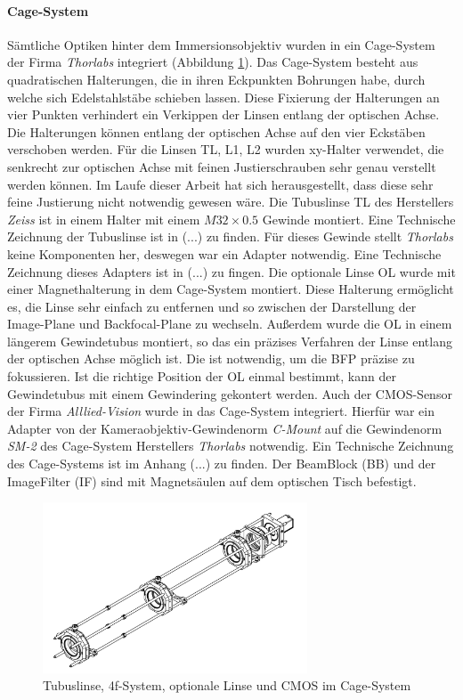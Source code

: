 \documentclass[titlepage]{article}
\begin{document}
	\paragraph{Cage-System}
	Sämtliche Optiken hinter dem Immersionsobjektiv wurden in ein Cage-System der Firma \textit{Thorlabs} integriert (Abbildung \ref{fig:cage_system}). Das Cage-System besteht aus quadratischen Halterungen, die in ihren Eckpunkten Bohrungen habe, durch welche sich Edelstahlstäbe schieben lassen. Diese Fixierung der Halterungen an vier Punkten verhindert ein Verkippen der Linsen entlang der optischen Achse. Die Halterungen können entlang der optischen Achse auf den vier Eckstäben verschoben werden. Für die  Linsen TL, L1, L2 wurden xy-Halter verwendet, die senkrecht zur optischen Achse mit feinen Justierschrauben sehr genau verstellt werden können. Im Laufe dieser Arbeit hat sich herausgestellt, dass diese sehr feine Justierung nicht notwendig gewesen wäre. Die Tubuslinse TL des Herstellers \textit{Zeiss} ist in einem Halter mit einem $M32\times0.5$ Gewinde montiert. Eine Technische Zeichnung der Tubuslinse ist in (...) zu finden. Für dieses Gewinde stellt \textit{Thorlabs} keine Komponenten her, deswegen war ein Adapter notwendig. Eine Technische Zeichnung dieses Adapters ist in (...) zu fingen. Die optionale Linse OL wurde mit einer Magnethalterung in dem Cage-System montiert. Diese Halterung ermöglicht es, die Linse sehr einfach zu entfernen und so zwischen der Darstellung der Image-Plane und Backfocal-Plane zu wechseln. Außerdem wurde die OL in einem längerem Gewindetubus montiert, so das ein präzises Verfahren der Linse entlang der optischen Achse möglich ist. Die ist notwendig, um die BFP präzise zu fokussieren. Ist die richtige Position der OL einmal bestimmt, kann der Gewindetubus mit einem Gewindering gekontert werden. Auch der CMOS-Sensor der Firma \textit{Alllied-Vision} wurde in das Cage-System integriert. Hierfür war ein Adapter von der Kameraobjektiv-Gewindenorm \textit{C-Mount} auf die Gewindenorm \textit{SM-2} des Cage-System Herstellers \textit{Thorlabs} notwendig. Ein Technische Zeichnung des Cage-Systems ist im Anhang (...) zu finden. Der BeamBlock (BB) und der ImageFilter (IF) sind mit Magnetsäulen auf dem optischen Tisch befestigt.
	\begin{figure}[htbp] 
		\centering
		\includegraphics[width=0.7\textwidth]{figures/Cage_System.pdf}
		\caption{Tubuslinse, 4f-System, optionale Linse und CMOS im Cage-System}
		\label{fig:cage_system}
	\end{figure}	
\end{document}
